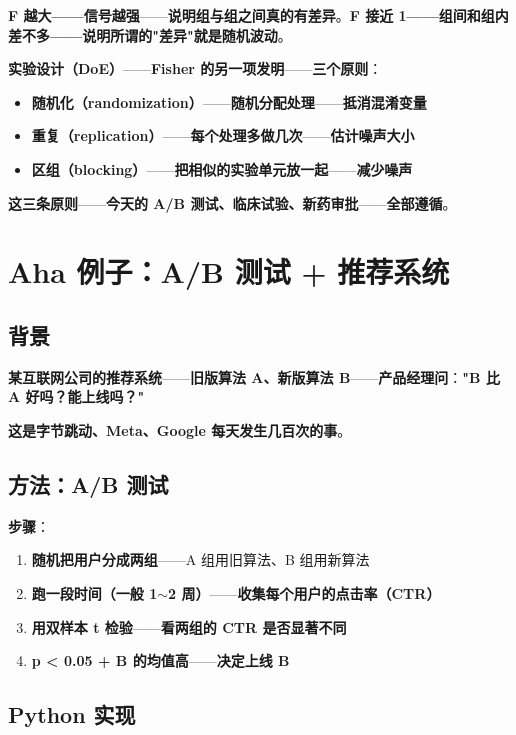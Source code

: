 \textbf{F 越大——信号越强}——\textbf{说明组与组之间真的有差异}。\textbf{F 接近 1——组间和组内差不多——说明所谓的"差异"就是随机波动}。

\textbf{实验设计（DoE）}——\textbf{Fisher 的另一项发明}——\textbf{三个原则}：

\begin{itemize}
\item \textbf{随机化（randomization）}——\textbf{随机分配处理}——\textbf{抵消混淆变量}
\item \textbf{重复（replication）}——\textbf{每个处理多做几次}——\textbf{估计噪声大小}
\item \textbf{区组（blocking）}——\textbf{把相似的实验单元放一起}——\textbf{减少噪声}
\end{itemize}

\textbf{这三条原则}——\textbf{今天的 A/B 测试、临床试验、新药审批}——\textbf{全部遵循}。

\section{Aha 例子：A/B 测试 + 推荐系统}

\subsection{背景}

\textbf{某互联网公司的推荐系统}——\textbf{旧版算法 A、新版算法 B}——\textbf{产品经理问}：\textbf{"B 比 A 好吗？能上线吗？"}

\textbf{这是字节跳动、Meta、Google 每天发生几百次的事}。

\subsection{方法：A/B 测试}

\textbf{步骤}：

\begin{enumerate}
\item \textbf{随机把用户分成两组}——A 组用旧算法、B 组用新算法
\item \textbf{跑一段时间（一般 1$\sim$2 周）}——\textbf{收集每个用户的点击率（CTR）}
\item \textbf{用双样本 t 检验}——\textbf{看两组的 CTR 是否显著不同}
\item \textbf{p < 0.05 + B 的均值高}——\textbf{决定上线 B}
\end{enumerate}

\subsection{Python 实现}

